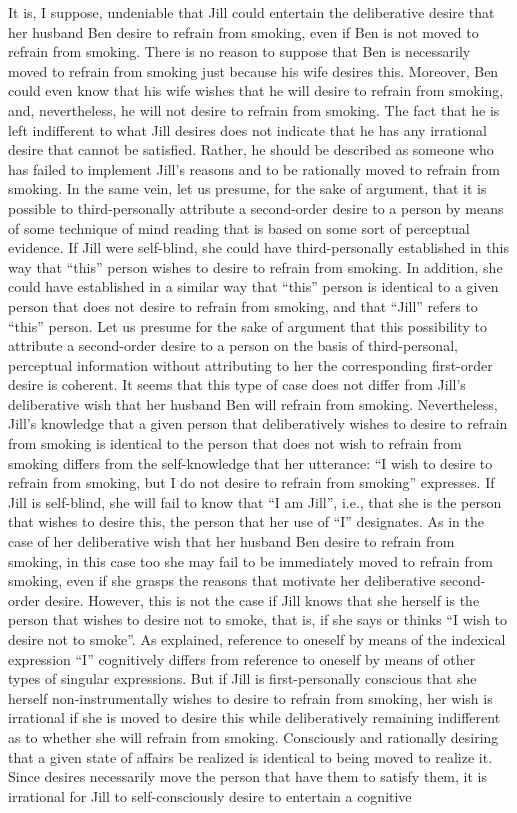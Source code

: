 \documentclass[output=paper,colorlinks,citecolor=brown
]{langscibook}
\begin{document}
It is, I suppose, undeniable that Jill could entertain the deliberative desire that her husband Ben desire to refrain from smoking, even if Ben is not moved to refrain from smoking. There is no reason to suppose that Ben is necessarily moved to refrain from smoking just because his wife desires this. Moreover, Ben could even know that his wife wishes that he will desire to refrain from smoking, and, nevertheless, he will not desire to refrain from smoking. The fact that he is left indifferent to what Jill desires does not indicate that he has any irrational desire that cannot be satisfied. Rather, he should be described as someone who has failed to implement Jill's reasons and to be rationally moved to refrain from smoking. In the same vein, let us presume, for the sake of argument, that it is possible to third-personally attribute a second-order desire to a person by means of some technique of mind reading that is based on some sort of perceptual evidence. If Jill were self-blind, she could have third-personally established in this way that “this” person wishes to desire to refrain from smoking. In addition, she could have established in a similar way that “this” person is identical to a given person that does not desire to refrain from smoking, and that “Jill” refers to “this” person. Let us presume for the sake of argument that this possibility to attribute a second-order desire to a person on the basis of third-personal, perceptual information without attributing to her the corresponding first-order desire is coherent. It seems that this type of case does not differ from Jill’s deliberative wish that her husband Ben will refrain from smoking. Nevertheless, Jill’s knowledge that a given person that deliberatively wishes to desire to refrain from smoking is identical to the person that does not wish to refrain from smoking differs from the self-knowledge that her utterance: “I wish to desire to refrain from smoking, but I do not desire to refrain from smoking” expresses. If Jill is self-blind, she will fail to know that “I am Jill”, i.e., that she is the person that wishes to desire this, the person that her use of “I” designates. As in the case of her deliberative wish that her husband Ben desire to refrain from smoking, in this case too she may fail to be immediately moved to refrain from smoking, even if she grasps the reasons that motivate her deliberative second-order desire. However, this is not the case if Jill knows that she herself is the person that wishes to desire not to smoke, that is, if  she says or thinks “I wish to desire not to smoke”. As \citet{perry1979problem} explained, reference to oneself by means of the indexical expression “I” cognitively differs from reference to oneself by means of other types of singular expressions.  But if Jill is first-personally conscious that she herself non-instrumentally wishes to desire to refrain from smoking, her wish is irrational if she is moved to desire this while deliberatively remaining indifferent as to whether she will refrain from smoking. Consciously and rationally desiring that a given state of affairs be realized is identical to being moved to realize it. Since desires necessarily move the person that have them to satisfy them, it is irrational for Jill to self-consciously desire to entertain a cognitive 
\end{document}
